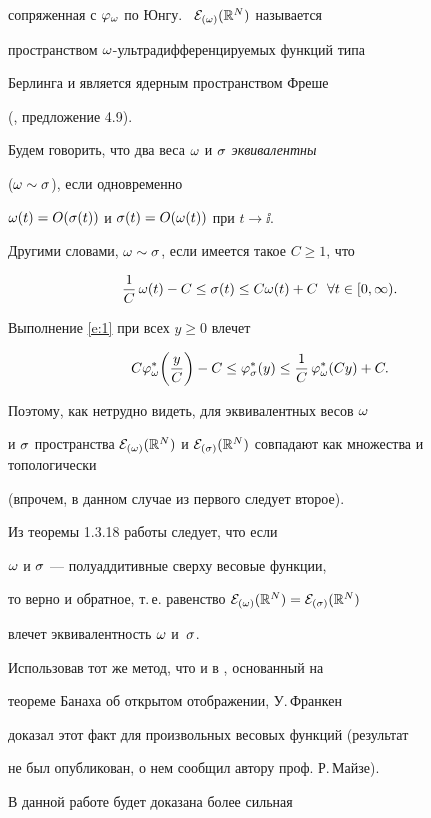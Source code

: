 сопряженная с $\varphi_\omega$ по Юнгу. \ ${\cal E}_{(\omega)}(\Bbb R^N)$ называется


пространством $\omega$-ультрадифференцируемых функций типа


Берлинга и является ядерным пространством Фреше


(\cite{Braun}, предложение 4.9). 





Будем говорить, что два веса $\omega$ и $\sigma$ {\it эквивалентны}


($\omega\sim\sigma$), если одновременно 


$\omega(t)=O(\sigma(t))$ и $\sigma(t)=O(\omega(t))$ при $t\to\ii$. 


Другими словами, $\omega\sim\sigma$, если имеется такое $C\geq 1$, что


\begin{equation}\label{e:1}


\frac{1}{C}\,\o(t)-C\le\s(t)\le C\o(t)+C\ \ \forall t\in[0,\ii).


\end{equation}


Выполнение \eqref{e:1} при всех $y\geq 0$ влечет


$$


C\vvi\bigg(\frac{y}{C}\bigg)-C\le\vsi(y)\le\frac{1}{C}\,\vvi(Cy)+C.


$$


Поэтому, как нетрудно видеть, для эквивалентных весов $\omega$


и $\sigma$ пространства ${\cal E}_{(\omega)}(\Bbb R^N)$ и ${\cal E}_{(\sigma)}(\Bbb R^N)$ совпадают как множества и топологически


(впрочем, в данном случае из первого следует второе). 


Из теоремы 1.3.18 работы \cite{Bjorck} следует, что если 


$\omega$ и $\sigma$ --- полуаддитивные сверху весовые функции,


то верно и обратное, т.\,е. равенство ${\cal E}_{(\omega)}(\Bbb R^N)={\cal E}_{(\sigma)}(\Bbb R^N)$


влечет эквивалентность $\omega$ и~$\sigma$.


Использовав тот же метод, что и в \cite{Bjorck}, основанный на


теореме Банаха об открытом отображении, У.\,Франкен


доказал этот факт для произвольных весовых функций (результат 


не был опубликован, о нем сообщил автору проф. Р.\,Майзе).


В данной работе будет доказана более сильная 









